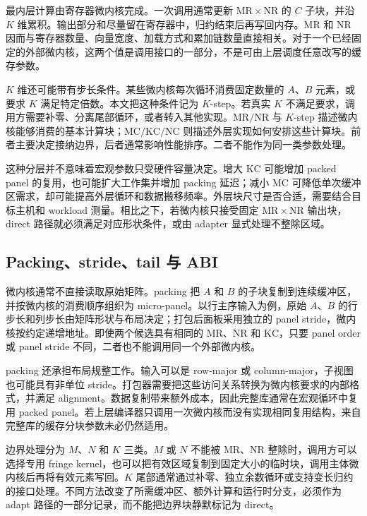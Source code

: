 最内层计算由寄存器微内核完成。一次调用通常更新 $\mathrm{MR}\times\mathrm{NR}$ 的 $C$ 子块，并沿 $K$ 维累积。输出部分和尽量留在寄存器中，归约结束后再写回内存。$\mathrm{MR}$ 和 $\mathrm{NR}$ 因而与寄存器数量、向量宽度、加载方式和累加链数量直接相关。对于一个已经固定的外部微内核，这两个值是调用接口的一部分，不是可由上层调度任意改写的缓存参数。

$K$ 维还可能带有步长条件。某些微内核每次循环消费固定数量的 $A$、$B$ 元素，或要求 $K$ 满足特定倍数。本文把这种条件记为 $K$-step。若真实 $K$ 不满足要求，调用方需要补零、分离尾部循环，或者转入其他实现。$\mathrm{MR}/\mathrm{NR}$ 与 $K$-step 描述微内核能够消费的基本计算块；$\mathrm{MC}/\mathrm{KC}/\mathrm{NC}$ 则描述外层实现如何安排这些计算块。前者主要决定接纳边界，后者通常影响性能排序。二者不能作为同一类参数处理。

这种分层并不意味着宏观参数只受硬件容量决定。增大 $\mathrm{KC}$ 可能增加 packed panel 的复用，也可能扩大工作集并增加 packing 延迟；减小 $\mathrm{MC}$ 可降低单次缓冲区需求，却可能提高外层循环和数据搬移频率。外层块尺寸是否合适，需要结合目标主机和 workload 测量。相比之下，若微内核只接受固定 $\mathrm{MR}\times\mathrm{NR}$ 输出块，direct 路径就必须满足对应形状条件，或由 adapter 显式处理不整除区域。

\subsection{Packing、stride、tail 与 ABI}

微内核通常不直接读取原始矩阵。packing 把 $A$ 和 $B$ 的子块复制到连续缓冲区，并按微内核的消费顺序组织为 micro-panel。以行主序输入为例，原始 $A$、$B$ 的行步长和列步长由矩阵形状与布局决定；打包后面板采用独立的 panel stride，微内核按约定递增地址。即使两个候选具有相同的 $\mathrm{MR}$、$\mathrm{NR}$ 和 $\mathrm{KC}$，只要 panel order 或 panel stride 不同，二者也不能调用同一个外部微内核。

packing 还承担布局规整工作。输入可以是 row-major 或 column-major，子视图也可能具有非单位 stride。打包器需要把这些访问关系转换为微内核要求的内部格式，并满足 alignment。数据复制带来额外成本，因此完整库通常在宏观循环中复用 packed panel。若上层编译器只调用一次微内核而没有实现相同复用结构，来自完整库的缓存分块参数未必仍然适用。

边界处理分为 $M$、$N$ 和 $K$ 三类。$M$ 或 $N$ 不能被 $\mathrm{MR}$、$\mathrm{NR}$ 整除时，调用方可以选择专用 fringe kernel，也可以把有效区域复制到固定大小的临时块，调用主体微内核后再将有效元素写回。$K$ 尾部通常通过补零、独立余数循环或支持变长归约的接口处理。不同方法改变了所需缓冲区、额外计算和运行时分支，必须作为 adapt 路径的一部分记录，而不能把边界块静默标记为 direct。

